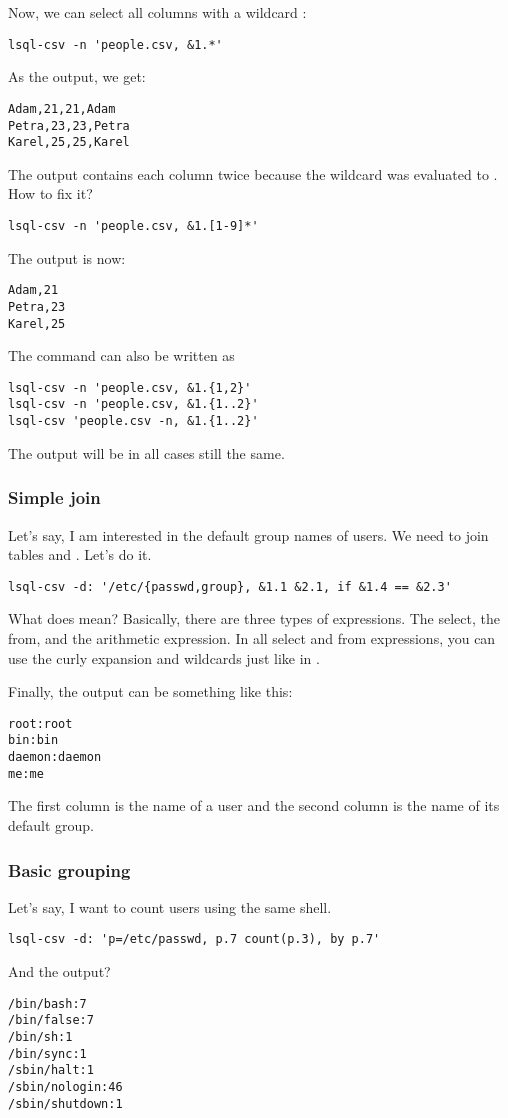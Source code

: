 Now, we can select all columns with a wildcard :
\begin{verbatim}
lsql-csv -n 'people.csv, &1.*'
\end{verbatim}
As the output, we get:
\begin{verbatim}
Adam,21,21,Adam
Petra,23,23,Petra
Karel,25,25,Karel
\end{verbatim}

The output contains each column twice because the wildcard  was evaluated to .
How to fix it?
\begin{verbatim}
lsql-csv -n 'people.csv, &1.[1-9]*'
\end{verbatim}
The output is now:
\begin{verbatim}
Adam,21
Petra,23
Karel,25
\end{verbatim}

The command can also be written as
\begin{verbatim}
lsql-csv -n 'people.csv, &1.{1,2}'
lsql-csv -n 'people.csv, &1.{1..2}'
lsql-csv 'people.csv -n, &1.{1..2}'
\end{verbatim}
The output will be in all cases still the same.


\subsubsection{Simple join}
Let's say, I am interested in the default group names of users. We need to join tables  and . Let's do it.
\begin{verbatim}
lsql-csv -d: '/etc/{passwd,group}, &1.1 &2.1, if &1.4 == &2.3'
\end{verbatim}
What does  mean? Basically, there are three types of expressions. The select, the from, and the arithmetic expression. 
In all select and from expressions, you can use the curly expansion and wildcards just like in  \cite{bash-reference-manual}.

Finally, the output can be something like this:
\begin{verbatim}
root:root
bin:bin
daemon:daemon
me:me
\end{verbatim}
The first column is the name of a user and the second column is the name of its default group.


\subsubsection{Basic grouping}
Let's say, I want to count users using the same shell.
\begin{verbatim}
lsql-csv -d: 'p=/etc/passwd, p.7 count(p.3), by p.7'
\end{verbatim}
And the output?
\begin{verbatim}
/bin/bash:7
/bin/false:7
/bin/sh:1
/bin/sync:1
/sbin/halt:1
/sbin/nologin:46
/sbin/shutdown:1
\end{verbatim}

